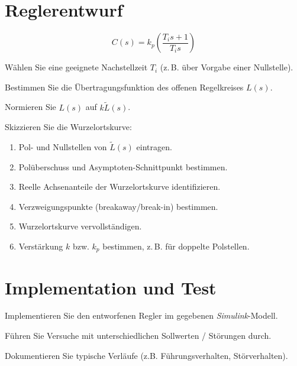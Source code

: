 \documentclass[a4paper,11pt]{scrartcl}
\begin{document}
\section{Reglerentwurf}

\[
    C(s) = k_p \left( \frac{T_i s + 1}{T_i s} \right)
\]

\begin{aufgaben}
    \item Wählen Sie eine geeignete Nachstellzeit $T_i$ (z.\,B. über Vorgabe einer Nullstelle).
    \item Bestimmen Sie die Übertragungsfunktion des offenen Regelkreises $L(s)$.
    \item Normieren Sie $L(s)$ auf $k \tilde{L}(s)$.
    \item Skizzieren Sie die Wurzelortskurve:
    \begin{enumerate}[label*=\alph*), leftmargin=2em]
        \item Pol- und Nullstellen von $\tilde{L}(s)$ eintragen.
        \item Polüberschuss und Asymptoten-Schnittpunkt bestimmen.
        \item Reelle Achsenanteile der Wurzelortskurve identifizieren.
        \item Verzweigungspunkte (breakaway/break-in) bestimmen.
        \item Wurzelortskurve vervollständigen.
        \item Verstärkung $k$ bzw. $k_p$ bestimmen, z.\,B. für doppelte Polstellen.
    \end{enumerate}
\end{aufgaben}

\begin{answerboxfillpage}
\end{answerboxfillpage}

\section{Implementation und Test}


\begin{aufgaben}
    \item Implementieren Sie den entworfenen Regler im gegebenen \emph{Simulink}-Modell.
    \item Führen Sie Versuche mit unterschiedlichen Sollwerten / Störungen durch.
    \item Dokumentieren Sie typische Verläufe (z.B. Führungsverhalten, Störverhalten).
\end{aufgaben}
\end{document}
